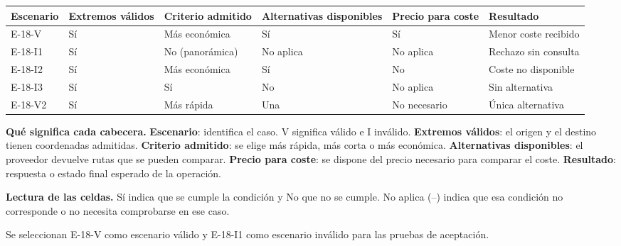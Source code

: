 \begingroup\fontsize{7.8}{11}\selectfont\setlength{\tabcolsep}{3pt}
\begin{tabularx}{\linewidth}{@{}*{6}{Y}@{}}\toprule
\textbf{Escenario} & \textbf{Extremos válidos} & \textbf{Criterio admitido} & \textbf{Alternativas disponibles} & \textbf{Precio para coste} & \textbf{Resultado}\\\midrule
E-18-V & Sí & Más económica & Sí & Sí & Menor coste recibido\\[3pt]
E-18-I1 & Sí & No (panorámica) & No aplica & No aplica & Rechazo sin consulta\\[3pt]
E-18-I2 & Sí & Más económica & Sí & No & Coste no disponible\\[3pt]
E-18-I3 & Sí & Sí & No & No aplica & Sin alternativa\\[3pt]
E-18-V2 & Sí & Más rápida & Una & No necesario & Única alternativa\\[3pt]
\bottomrule\end{tabularx}\endgroup\par
{\fontsize{9}{11}\selectfont\textbf{Qué significa cada cabecera.} \textbf{Escenario}: identifica el caso. V significa válido e I inválido. \textbf{Extremos válidos}: el origen y el destino tienen coordenadas admitidas. \textbf{Criterio admitido}: se elige más rápida, más corta o más económica. \textbf{Alternativas disponibles}: el proveedor devuelve rutas que se pueden comparar. \textbf{Precio para coste}: se dispone del precio necesario para comparar el coste. \textbf{Resultado}: respuesta o estado final esperado de la operación.\par\textbf{Lectura de las celdas.} Sí indica que se cumple la condición y No que no se cumple. No aplica (--) indica que esa condición no corresponde o no necesita comprobarse en ese caso.\par}


Se seleccionan E-18-V como escenario válido y E-18-I1 como escenario inválido para las pruebas de aceptación.\par


